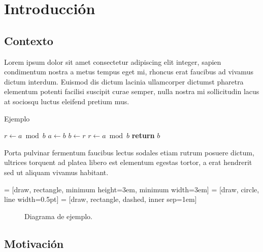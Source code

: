 \chapter{Introducción}

\section{Contexto}

\noindent Lorem ipsum dolor sit amet consectetur adipiscing elit integer, sapien condimentum nostra a metus tempus eget mi, rhoncus erat faucibus ad vivamus dictum interdum. Euismod dis dictum lacinia ullamcorper dictumst pharetra elementum potenti facilisi suscipit curae semper, nulla nostra mi sollicitudin lacus at sociosqu luctus eleifend pretium mus.

\begin{algorithm}[H]
  \caption{Ejemplo}\label{euclid}
  \begin{algorithmic}[1]
     
        \State $r\gets a \bmod b$
         
            \State $a \gets b$
            \State $b \gets r$
            \State $r \gets a \bmod b$
        \EndWhile\label{euclidendwhile}
        \State \textbf{return} $b$
    \EndProcedure
  \end{algorithmic}
\end{algorithm}

Porta \cite{Cantu-Paz98asurvey} pulvinar fermentum faucibus lectus sodales etiam rutrum posuere dictum, ultrices torquent ad platea libero est elementum egestas tortor, a erat hendrerit sed ut aliquam vivamus habitant.

 = [draw, rectangle, minimum height=3em, minimum width=3em]
 = [draw, circle, line width=0.5pt]
 = [draw, rectangle, dashed, inner sep=1em]
\begin{figure*}[h]
  \centering
  \caption{Diagrama de ejemplo.}
\end{figure*}

\newpage

\section{Motivación}
\cleardoublepage



